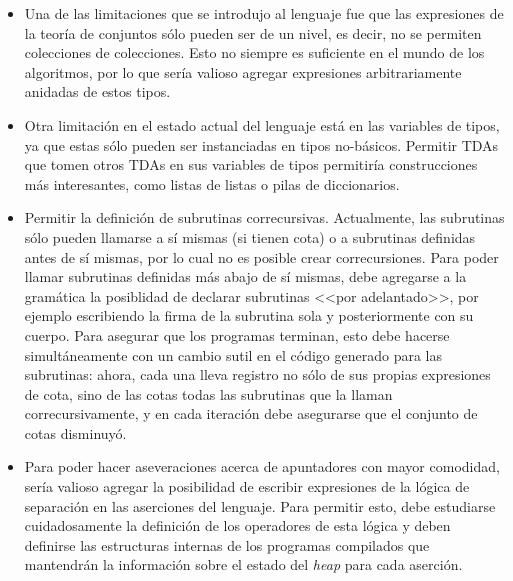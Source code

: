 \begin{itemize}
  \item Una de las limitaciones que se introdujo al lenguaje fue que las
  expresiones de la teoría de conjuntos sólo pueden ser de un nivel, es decir,
  no se permiten colecciones de colecciones. Esto no siempre es suficiente en el
  mundo de los algoritmos, por lo que sería valioso agregar expresiones
  arbitrariamente anidadas de estos tipos.

  \item Otra limitación en el estado actual del lenguaje está en las variables
  de tipos, ya que estas sólo pueden ser instanciadas en tipos no-básicos.
  Permitir TDAs que tomen otros TDAs en sus variables de tipos permitiría
  construcciones más interesantes, como listas de listas o pilas de
  diccionarios.

  \item Permitir la definición de subrutinas correcursivas. Actualmente, las
  subrutinas sólo pueden llamarse a sí mismas (si tienen cota) o a subrutinas
  definidas antes de sí mismas, por lo cual no es posible crear correcursiones.
  Para poder llamar subrutinas definidas más abajo de sí mismas, debe agregarse
  a la gramática la posiblidad de declarar subrutinas <<por adelantado>>, por
  ejemplo escribiendo la firma de la subrutina sola y posteriormente con su
  cuerpo. Para asegurar que los programas terminan, esto debe hacerse
  simultáneamente con un cambio sutil en el código generado para las subrutinas:
  ahora, cada una lleva registro no sólo de sus propias expresiones de cota,
  sino de las cotas todas las subrutinas que la llaman correcursivamente, y en
  cada iteración debe asegurarse que el conjunto de cotas disminuyó.

  \item Para poder hacer aseveraciones acerca de apuntadores con mayor
  comodidad, sería valioso agregar la posibilidad de escribir expresiones de la
  lógica de separación en las aserciones del lenguaje. Para permitir esto, debe
  estudiarse cuidadosamente la definición de los operadores de esta lógica y
  deben definirse las estructuras internas de los programas compilados que
  mantendrán la información sobre el estado del \textit{heap} para cada
  aserción.

\end{itemize}
